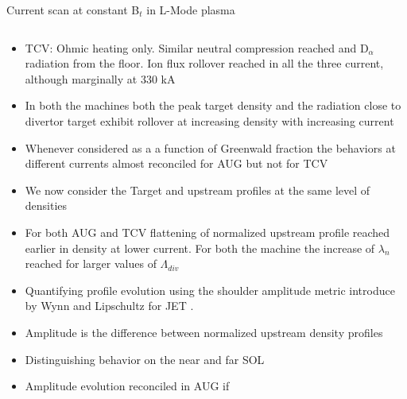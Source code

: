 \documentclass[10pt, compress]{beamer}
\begin{document}
\begin{frame}{Current scan at constant B$_t$ in L-Mode plasma}
\begin{columns}
\begin{column}{0.4\textwidth}
\begin{itemize}
          avoid earlier disruption. Similar neutral pressure in the
          subdivertor region reached. NBI additional power added to
          keep power in the SOL approximately constant
        \item<3|only@3> TCV: Ohmic heating only. Similar neutral compression reached and
          D$_{\alpha}$ radiation from the floor. Ion flux rollover
          reached in all the three current,  although marginally at
          330 kA
        \item<4|only@4> In both the machines both the peak target
          density and the radiation close to divertor target exhibit
          rollover at increasing density with increasing current
        \item<5|only@5> Whenever considered as a a function of
          Greenwald fraction the behaviors at different currents
          almost reconciled for AUG \alert{but not for TCV}
        \item<only@6-7> We now consider the Target and upstream
          profiles at the same level of densities  
        \item<only@7> For both AUG and TCV flattening of normalized
          upstream profile reached \alert{earlier in density at lower
            current.} For both the machine the increase of $\lambda_n$
          reached for larger values of $\Lambda_{div}$
        \item<only@8> Quantifying profile evolution using the
          \alert{shoulder amplitude metric} introduce by Wynn and
          Lipschultz for JET \parencite{Wynn:2018gp}.
        \item<only@8>  \alert{Amplitude is the difference
            between normalized upstream density profiles}
        \item<only@8> Distinguishing behavior on the near and far SOL  
        \item<only@11> Amplitude evolution reconciled in AUG if

\end{itemize}
\end{column}
\end{columns}
\end{frame}
\end{document}
